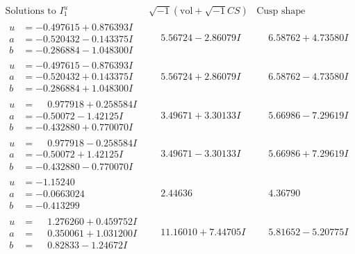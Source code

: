 \documentclass[1p]{elsarticle_modified}
\theoremstyle{definition}
\newcommand{\I}{\sqrt{-1}}
\begin{document}
$$\begin{array}{c|c|c}  
\text{Solutions to }I^u_{1}& \I (\text{vol} + \sqrt{-1}CS) & \text{Cusp shape}\\
 \hline 
\begin{aligned}
u &= -0.497615 + 0.876393 I \\
a &= -0.520432 - 0.143375 I \\
b &= -0.286884 - 1.048300 I\end{aligned}
 & \phantom{-}5.56724 - 2.86079 I & \phantom{-}6.58762 + 4.73580 I \\ \hline\begin{aligned}
u &= -0.497615 - 0.876393 I \\
a &= -0.520432 + 0.143375 I \\
b &= -0.286884 + 1.048300 I\end{aligned}
 & \phantom{-}5.56724 + 2.86079 I & \phantom{-}6.58762 - 4.73580 I \\ \hline\begin{aligned}
u &= \phantom{-}0.977918 + 0.258584 I \\
a &= -0.50072 - 1.42125 I \\
b &= -0.432880 + 0.770070 I\end{aligned}
 & \phantom{-}3.49671 + 3.30133 I & \phantom{-}5.66986 - 7.29619 I \\ \hline\begin{aligned}
u &= \phantom{-}0.977918 - 0.258584 I \\
a &= -0.50072 + 1.42125 I \\
b &= -0.432880 - 0.770070 I\end{aligned}
 & \phantom{-}3.49671 - 3.30133 I & \phantom{-}5.66986 + 7.29619 I \\ \hline\begin{aligned}
u &= -1.15240\phantom{ +0.000000I} \\
a &= -0.0663024\phantom{ +0.000000I} \\
b &= -0.413299\phantom{ +0.000000I}\end{aligned}
 & \phantom{-}2.44636\phantom{ +0.000000I} & \phantom{-}4.36790\phantom{ +0.000000I} \\ \hline\begin{aligned}
u &= \phantom{-}1.276260 + 0.459752 I \\
a &= \phantom{-}0.350061 + 1.031200 I \\
b &= \phantom{-}0.82833 - 1.24672 I\end{aligned}
 & \phantom{-}11.16010 + 7.44705 I & \phantom{-}5.81652 - 5.20775 I \\ \hline\begin{aligned}

\end{aligned}
\end{array}$$
\end{document}
